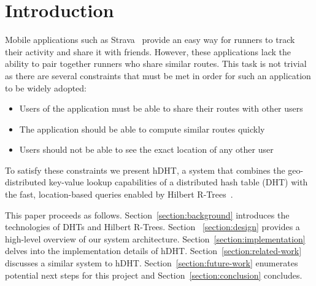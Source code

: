 \section{Introduction}
Mobile applications such as Strava~\cite{strava} provide an easy way for runners to track their activity and share it with friends. However, these applications lack the ability to pair together runners who share similar routes. This task is not trivial as there are several constraints that must be met in order for such an application to be widely adopted:
\begin{itemize}
	\item Users of the application must be able to share their routes with other users
	\item The application should be able to compute similar routes quickly
	\item Users should not be able to see the exact location of any other user
\end{itemize}

To satisfy these constraints we present hDHT, a system that combines the geo-distributed key-value lookup capabilities of a distributed hash table (DHT) with the fast, location-based queries enabled by Hilbert R-Trees~\cite{kamel1993hilbert}.


This paper proceeds as follows. Section~\ref{section:background} introduces the technologies of DHTs and Hilbert R-Trees. Section ~\ref{section:design} provides a high-level overview of our system architecture. Section~\ref{section:implementation} delves into the implementation details of hDHT. Section~\ref{section:related-work} discusses a similar system to hDHT. Section~\ref{section:future-work} enumerates potential next steps for this project and Section~\ref{section:conclusion} concludes.